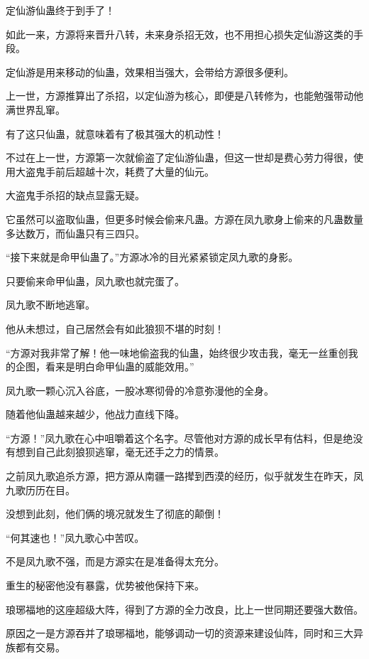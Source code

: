 
\begin{this_body}

定仙游仙蛊终于到手了！

如此一来，方源将来晋升八转，未来身杀招无效，也不用担心损失定仙游这类的手段。

定仙游是用来移动的仙蛊，效果相当强大，会带给方源很多便利。

上一世，方源推算出了杀招，以定仙游为核心，即便是八转修为，也能勉强带动他满世界乱窜。

有了这只仙蛊，就意味着有了极其强大的机动性！

不过在上一世，方源第一次就偷盗了定仙游仙蛊，但这一世却是费心劳力得很，使用大盗鬼手前后超越十次，耗费了大量的仙元。

大盗鬼手杀招的缺点显露无疑。

它虽然可以盗取仙蛊，但更多时候会偷来凡蛊。方源在凤九歌身上偷来的凡蛊数量多达数万，而仙蛊只有三四只。

“接下来就是命甲仙蛊了。”方源冰冷的目光紧紧锁定凤九歌的身影。

只要偷来命甲仙蛊，凤九歌也就完蛋了。

凤九歌不断地逃窜。

他从未想过，自己居然会有如此狼狈不堪的时刻！

“方源对我非常了解！他一味地偷盗我的仙蛊，始终很少攻击我，毫无一丝重创我的企图，看来是明白命甲仙蛊的威能效用。”

凤九歌一颗心沉入谷底，一股冰寒彻骨的冷意弥漫他的全身。

随着他仙蛊越来越少，他战力直线下降。

“方源！”凤九歌在心中咀嚼着这个名字。尽管他对方源的成长早有估料，但是绝没有想到自己此刻狼狈逃窜，毫无还手之力的情景。

之前凤九歌追杀方源，把方源从南疆一路撵到西漠的经历，似乎就发生在昨天，凤九歌历历在目。

没想到此刻，他们俩的境况就发生了彻底的颠倒！

“何其速也！”凤九歌心中苦叹。

不是凤九歌不强，而是方源实在是准备得太充分。

重生的秘密他没有暴露，优势被他保持下来。

琅琊福地的这座超级大阵，得到了方源的全力改良，比上一世同期还要强大数倍。

原因之一是方源吞并了琅琊福地，能够调动一切的资源来建设仙阵，同时和三大异族都有交易。


\end{this_body}
